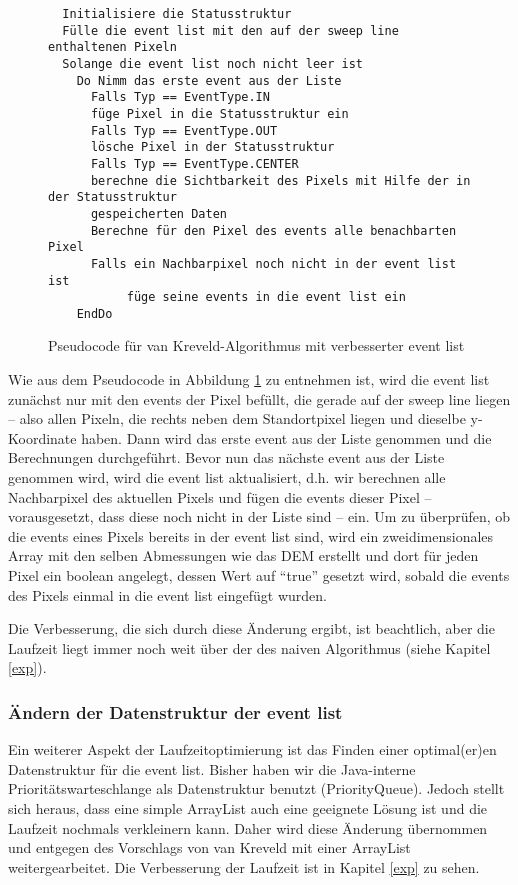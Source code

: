 \begin{figure}[!ht]
 \centering
 \begin{BVerbatim}
  Initialisiere die Statusstruktur 
  Fülle die event list mit den auf der sweep line enthaltenen Pixeln 
  Solange die event list noch nicht leer ist 
    Do Nimm das erste event aus der Liste 
      Falls Typ == EventType.IN
	  füge Pixel in die Statusstruktur ein
      Falls Typ == EventType.OUT
	  lösche Pixel in der Statusstruktur 
      Falls Typ == EventType.CENTER
	  berechne die Sichtbarkeit des Pixels mit Hilfe der in der Statusstruktur 
	  gespeicherten Daten
      Berechne für den Pixel des events alle benachbarten Pixel 
	  Falls ein Nachbarpixel noch nicht in der event list ist
	       füge seine events in die event list ein
    EndDo

 \end{BVerbatim}
 \caption{Pseudocode für van Kreveld-Algorithmus mit verbesserter event list}
 \label{pseudo_krev_ev_klein}
\end{figure}

Wie aus dem Pseudocode in Abbildung \ref{pseudo_krev_ev_klein} zu entnehmen ist, wird die event list zunächst nur mit den events der Pixel befüllt,
die gerade auf der sweep line liegen -- also allen Pixeln, die rechts neben dem Standortpixel liegen und dieselbe y-Koordinate haben. Dann wird das 
erste event aus der Liste genommen und die Berechnungen durchgeführt. Bevor nun das nächste event aus der Liste genommen wird, wird die event list 
aktualisiert, d.h. wir berechnen alle Nachbarpixel des aktuellen Pixels und fügen die events dieser Pixel -- vorausgesetzt, dass diese noch nicht in 
der Liste sind -- ein. Um zu überprüfen, ob die events eines Pixels bereits in der event list sind, wird ein zweidimensionales Array mit 
den selben Abmessungen wie das DEM erstellt und dort für jeden Pixel ein boolean angelegt, dessen Wert auf ``true'' gesetzt wird, sobald die events 
des Pixels einmal in die event list eingefügt wurden.

Die Verbesserung, die sich durch diese Änderung ergibt, ist beachtlich, aber die Laufzeit liegt immer noch weit über der des naiven Algorithmus 
(siehe Kapitel \ref{exp}).

\subsubsection{Ändern der Datenstruktur der event list}

Ein weiterer Aspekt der Laufzeitoptimierung ist das Finden einer optimal(er)en Datenstruktur für die event list. Bisher haben wir die Java-interne 
Prioritätswarteschlange als Datenstruktur benutzt (PriorityQueue). Jedoch stellt sich heraus, dass eine simple ArrayList auch eine geeignete Lösung
ist und die Laufzeit nochmals verkleinern kann. Daher wird diese Änderung übernommen und entgegen des Vorschlags von van Kreveld mit einer ArrayList
weitergearbeitet. Die Verbesserung der Laufzeit ist in Kapitel \ref{exp} zu sehen.

